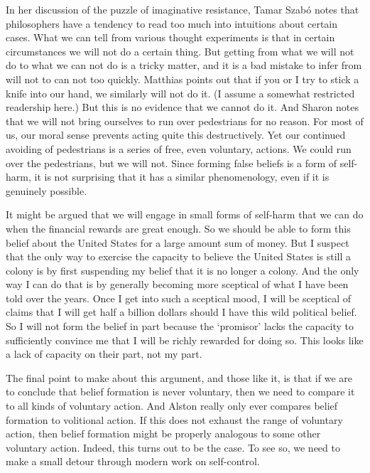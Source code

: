 In her discussion of the puzzle of imaginative resistance, Tamar Szab\'{o} \citet{Gendler2000} notes that philosophers have a tendency to read too much into intuitions about certain cases. What we can tell from various thought experiments is that in certain circumstances we will not do a certain thing. But getting from what we will not do to what we can not do is a tricky matter, and it is a bad mistake to infer from will not to can not too quickly. Matthias \citet{Steup2000} points out that if you or I try to stick a knife into our hand, we similarly will not do it. (I assume a somewhat restricted readership here.) But this is no evidence that we cannot do it. And Sharon \citet{Ryan2003} notes that we will not bring ourselves to run over pedestrians for no reason. For most of us, our moral sense prevents acting quite this destructively. Yet our continued avoiding of pedestrians is a series of free, even voluntary, actions. We could run over the pedestrians, but we will not. Since forming false beliefs is a form of self-harm, it is not surprising that it has a similar phenomenology, even if it is genuinely possible.

It might be argued that we will engage in small forms of self-harm that we can do when the financial rewards are great enough. So we should be able to form this belief about the United States for a large amount sum of money. But I suspect that the only way to exercise the capacity to believe the United States is still a colony is by first suspending my belief that it is no longer a colony. And the only way I can do that is by generally becoming more sceptical of what I have been told over the years. Once I get into such a sceptical mood, I will be sceptical of claims that I will get half a billion dollars should I have this wild political belief. So I will not form the belief in part because the `promisor' lacks the capacity to sufficiently convince me that I will be richly rewarded for doing so. This looks like a lack of capacity on their part, not my part.

The final point to make about this argument, and those like it, is that if we are to conclude that belief formation is never voluntary, then we need to compare it to all kinds of voluntary action. And Alston really only ever compares belief formation to volitional action. If this does not exhaust the range of voluntary action, then belief formation might be properly analogous to some other voluntary action. Indeed, this turns out to be the case. To see so, we need to make a small detour through modern work on self-control.


